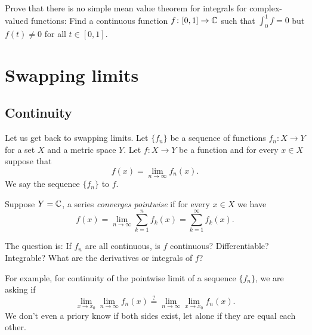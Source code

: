 \begin{exercise}
Prove that there is no simple mean value theorem for integrals
for complex-valued
functions:  Find a continuous function $f \colon [0,1] \to {\mathbb{C}}$ such that
$\int_0^1 f = 0$ but $f(t) \not= 0$ for all $t \in [0,1]$.
\end{exercise}



\sectionnewpage
\section{Swapping limits}
\label{sec:swaplim}


\subsection{Continuity}

Let us get back to swapping limits.  Let $\{ f_n \}$ be a sequence
of functions $f_n \colon X \to Y$ for a set $X$ and a metric space $Y$.
Let $f \colon X \to Y$ be a
function and for every $x \in X$ suppose that
\begin{equation*}
f(x) = \lim_{n\to \infty} f_n(x) .
\end{equation*}
We say the sequence $\{ f_n \}$
\emph{} to $f$.

Suppose $Y={\mathbb{C}}$, a series
\emph{converges pointwise} if
for every $x \in X$ we have
\begin{equation*}
f(x) = \lim_{n\to \infty} \sum_{k=1}^n f_k(x) =
\sum_{k=1}^\infty f_k(x) .
\end{equation*}

\medskip

The question is:
If $f_n$ are all continuous, is $f$ continuous?  Differentiable?
Integrable?  What are the derivatives or integrals of $f$?

For example, for continuity of the pointwise limit of a sequence $\{ f_n
\}$, we are asking if
\begin{equation*}
\lim_{x\to x_0} \lim_{n\to\infty} f_n(x)
\overset{?}{=}
\lim_{n\to\infty} \lim_{x\to x_0} f_n(x) .
\end{equation*}
We don't even a priory know if both sides exist, let alone if they are equal each other.

